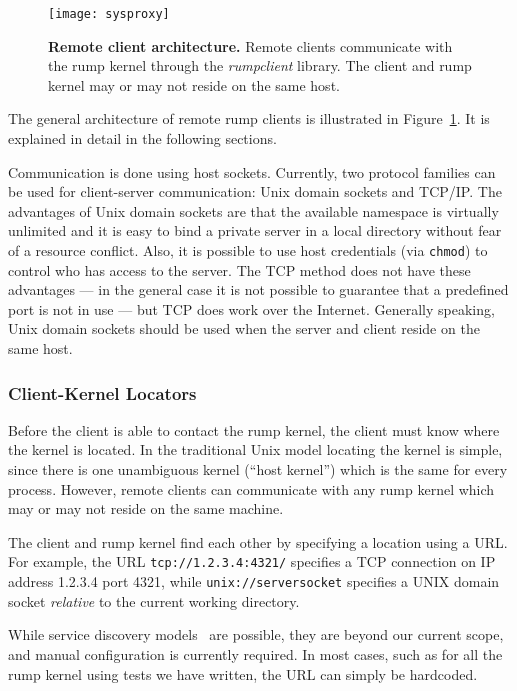 \begin{figure}[t]
\texttt{[image: sysproxy]}
\caption[Remote client architecture]{
\textbf{Remote client architecture.}
Remote clients communicate with the rump kernel through the
\textit{rumpclient} library.  The client and rump kernel may or
may not reside on the same host.
}
\label{fig:sysproxy}
\end{figure}

The general architecture of remote rump clients is illustrated in
Figure~\ref{fig:sysproxy}.  It is explained in detail in the
following sections.

Communication is done using host sockets.  Currently, two protocol
families can be used for client-server communication: Unix domain
sockets and TCP/IP.  The advantages of Unix domain sockets are that
the available namespace is virtually unlimited and it is easy to
bind a private server in a local directory without fear of a resource
conflict.  Also, it is possible to use host credentials (via
\texttt{chmod}) to control who has access to the server.  The TCP
method does not have these advantages --- in the general case it
is not possible to guarantee that a predefined port is not in use
--- but TCP does work over the Internet.  Generally speaking, Unix
domain sockets should be used when the server and client reside on
the same host.

\subsubsection{Client-Kernel Locators}

Before the client is able to contact the rump kernel, the client
must know where the kernel is located.  In the traditional Unix
model locating the kernel is simple, since there is one unambiguous kernel (``host
kernel'') which is the same for every process.  However, remote
clients can communicate with any rump kernel which may or may not
reside on the same machine.

The client and rump kernel find each other by specifying a location
using a URL.  For example, the URL \verb+tcp://1.2.3.4:4321/+
specifies a TCP connection on IP address 1.2.3.4 port 4321, while
\verb+unix://serversocket+ specifies a UNIX domain socket
\textit{relative} to the current working directory.

While service discovery models~\cite{czerwinski:sds} are possible,
they are beyond our current scope, and manual
configuration is currently required.  In most cases, such as for
all the rump kernel using tests we have written, the URL can simply
be hardcoded.


